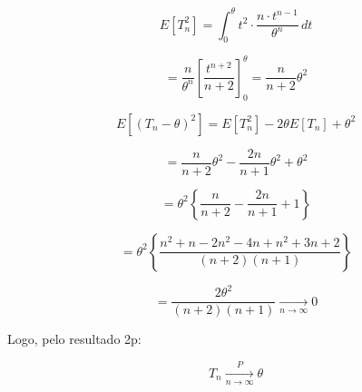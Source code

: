 \begin{equation}
E[T_n^2] = \int_{0}^{\theta} t^2 \cdot \frac{n \cdot t^{n-1}}{\theta^n} \, dt
\end{equation}

\begin{equation}
= \frac{n}{\theta^n} \left[ \frac{t^{n+2}}{n+2} \right]_{0}^{\theta} = \frac{n}{n+2} \theta^2
\end{equation}

\begin{equation}
E[(T_n - \theta)^2] = E[T_n^2] - 2\theta E[T_n] + \theta^2
\end{equation}

\begin{equation}
= \frac{n}{n+2} \theta^2 - \frac{2n}{n+1} \theta^2 + \theta^2
\end{equation}

\begin{equation}
= \theta^2 \left\{ \frac{n}{n+2} - \frac{2n}{n+1} + 1 \right\}
\end{equation}

\begin{equation}
= \theta^2 \left\{ \frac{n^2 + n - 2n^2 - 4n + n^2 + 3n + 2}{(n+2)(n+1)} \right\}
\end{equation}

\begin{equation}
= \frac{2\theta^2}{(n+2)(n+1)} \xrightarrow[n \to \infty]{} 0
\end{equation}

Logo, pelo resultado 2p:

\begin{equation}
T_n \xrightarrow[n \to \infty]{P} \theta
\end{equation}